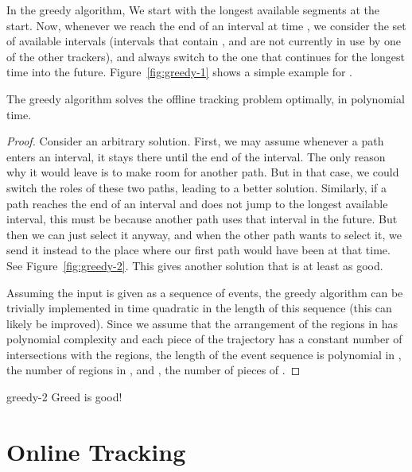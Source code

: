 \documentclass[runningheads]{llncs}
\begin{document}
    In the greedy algorithm, We start with the  longest available segments at the start.
    Now, whenever we reach the end of an interval at time , we consider the set of available intervals (intervals that contain , and are not currently in use by one of the other  trackers), and always switch to the one that continues for the longest time into the future. 
    Figure~\ref {fig:greedy-1} shows a simple example for .
  
    \begin {theorem} \label {thm:greedy}
    The greedy algorithm solves the offline tracking problem optimally, in polynomial time.
    \end {theorem}

    \begin {proof}
      Consider an arbitrary solution. First, we may assume whenever a path enters an interval, it stays there until the end of the interval. The only reason why it would leave is to make room for another path. But in that case, we could switch the roles of these two paths, leading to a better solution. Similarly, if a path reaches the end of an interval and does not jump to the longest available interval, this must be because another path uses that interval in the future. But then we can just select it anyway, and when the other path wants to select it, we send it instead to the place where our first path would have been at that time. 
      See Figure~\ref {fig:greedy-2}.
      This gives another solution that is at least as good.
      
      Assuming the input is given as a sequence of events, the greedy algorithm can be trivially implemented in time quadratic in the length of this sequence (this can likely be improved). Since we assume that the arrangement of the regions in   has polynomial complexity and each piece of the trajectory has a constant number of intersections with the regions, the length of the event sequence is polynomial in , the number of regions in , and , the number of pieces of .
    \end {proof}

     {greedy-2} {Greed is good!}









\section {Online Tracking} \label {sec:dynamic}
\end{document}

